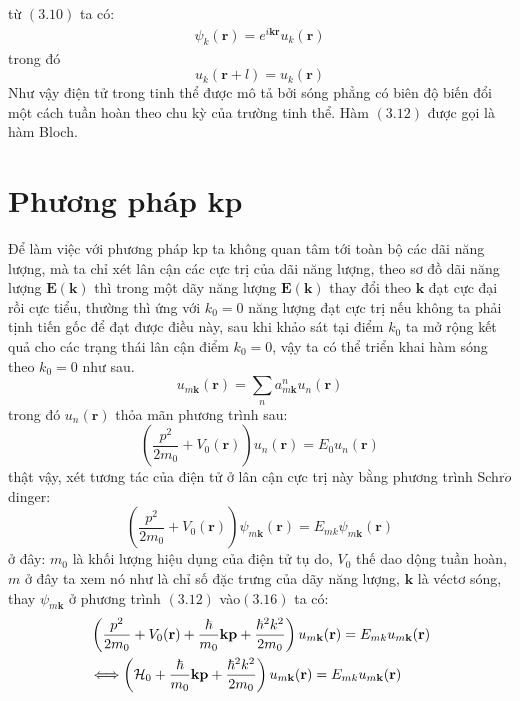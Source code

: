 từ $(3.10)$ ta có:
\begin{gather}
\psi_k\left(\mathbf{r}\right) = e^{i\mathbf{kr}}u_k\left(\mathbf{r}\right)
\end{gather}
trong đó
\begin{equation}
 u_k\left(\mathbf{r}+ \mathit{l}\right) = u_k\left(\mathbf{r}\right)
\end{equation}
Như vậy điện tử trong tinh thể được mô tả bởi sóng phẳng có biên độ biến đổi một cách tuần hoàn theo chu kỳ của trường tinh thể. Hàm $(3.12)$ được gọi là hàm Bloch. 

\section{Phương pháp kp}
   Để làm việc với phương pháp kp ta không quan tâm tới toàn bộ các dãi năng lượng, mà ta chỉ xét lân cận các cực trị của dãi năng lượng, theo sơ đồ dãi năng lượng $\mathbf{E}\left(\mathbf{k}\right)$ thì trong một dãy năng lượng $\mathbf{E}\left(\mathbf{k}\right)$ thay đổi theo $\mathbf{k}$ đạt cực đại rồi cực tiểu, thường thì ứng với $k_0=0$ năng lượng đạt cực trị nếu không ta phải tịnh tiến gốc để đạt được điều này, sau khi khảo sát tại điểm  $k_0$ ta mở rộng kết quả cho các trạng thái lân cận điểm  $k_0=0$, vậy ta có thể triển khai hàm sóng theo  $k_0=0$  như sau.
\begin{equation}
u_{m\mathbf{k}}\left(\mathbf{r}\right) = \sum_{n}a_{m\mathbf{k}}^nu_n\left(\mathbf{r}\right)
\end{equation}
trong đó $u_n\left(\mathbf{r}\right)$ thỏa mãn phương trình sau:
\begin{equation}
\left(\frac{p^2}{2m_0}+V_0(\mathbf{r}) \right)u_{n}(\mathbf{r}) = E_0u_{n}(\mathbf{r})
\end{equation}
thật vậy, xét tương tác của điện tử ở lân cận cực trị này bằng phương trình Schr$\ddot{o}$dinger:
\begin{equation}
\left(\frac{p^2}{2m_0}+V_0(\mathbf{r}) \right)\psi_{m\mathbf{k}}(\mathbf{r}) = E_{mk}\psi_{m\mathbf{k}}(\mathbf{r})
\end{equation}
ở đây: $m_0$ là khối lượng hiệu dụng của điện tử tụ do, $V_0$ thế dao dộng tuần hoàn, $m$ ở đây ta xem nó như là chỉ số đặc trưng của dãy năng lượng, $\mathbf{k}$ là véctơ sóng, 
thay $\psi_{m\mathbf{k}}$ ở phương trình $(3.12)$ vào$(3.16)$ ta có: \\
\begin{align}
&\left(\frac{p^2}{2m_0}+V_0(\mathbf{r}) + \frac{\hbar}{m_0}\mathbf{kp}+\frac{\hbar^2 k^2}{2m_0} \right)u_{m\mathbf{k}}(\mathbf{r}) = E_{mk}u_{m\mathbf{k}}(\mathbf{r})
\notag \\
&\Longleftrightarrow \left(\mathcal{H}_0 + \frac{\hbar}{m_0}\mathbf{kp}+\frac{\hbar^2 k^2}{2m_0}\right)u_{m\mathbf{k}}(\mathbf{r}) = E_{mk}u_{m\mathbf{k}}(\mathbf{r})
\end{align}

